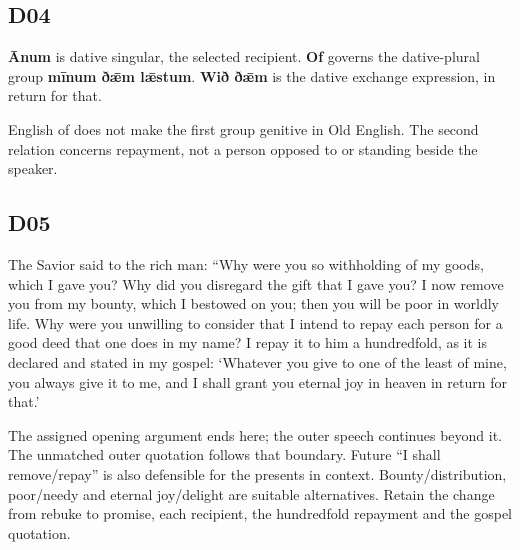 \subsection*{D04}

\par\begin{minipage}{\linewidth}\raggedright
\textbf{Ānum} is dative singular, the selected recipient. \textbf{Of} governs the dative-plural group \textbf{mīnum ðǣm lǣstum}. \textbf{Wið ðǣm} is the dative exchange expression, in return for that.

English of does not make the first group genitive in Old English. The second relation concerns repayment, not a person opposed to or standing beside the speaker.

\end{minipage}\par\addvspace{4pt}

\subsection*{D05}

\par\begin{minipage}{\linewidth}\raggedright
The Savior said to the rich man: “Why were you so withholding of my goods, which I gave you? Why did you disregard the gift that I gave you? I now remove you from my bounty, which I bestowed on you; then you will be poor in worldly life. Why were you unwilling to consider that I intend to repay each person for a good deed that one does in my name? I repay it to him a hundredfold, as it is declared and stated in my gospel: ‘Whatever you give to one of the least of mine, you always give it to me, and I shall grant you eternal joy in heaven in return for that.’

The assigned opening argument ends here; the outer speech continues beyond it. The unmatched outer quotation follows that boundary. Future “I shall remove/\allowbreak{}repay” is also defensible for the presents in context. Bounty/\allowbreak{}distribution, poor/\allowbreak{}needy and eternal joy/\allowbreak{}delight are suitable alternatives. Retain the change from rebuke to promise, each recipient, the hundredfold repayment and the gospel quotation.

\end{minipage}\par\addvspace{4pt}

